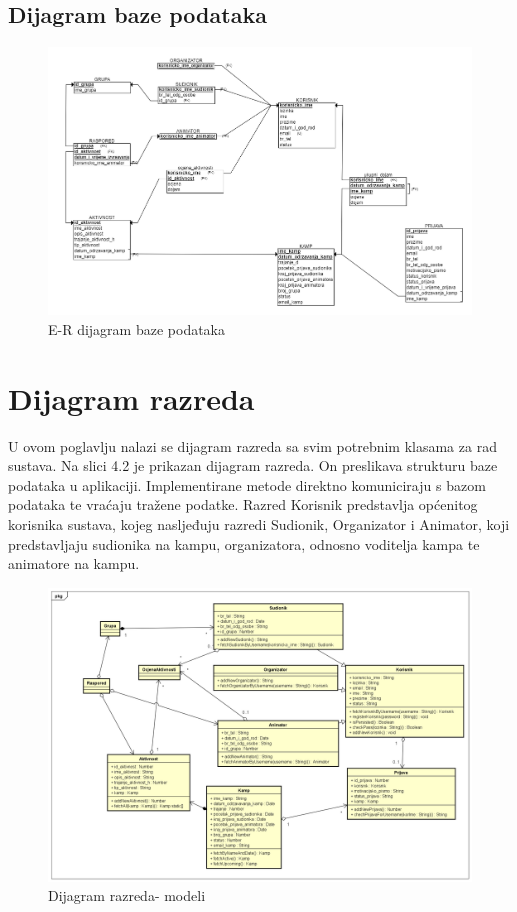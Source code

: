 			\eject
			
			
			\subsection{Dijagram baze podataka}
				\begin{figure}[H]
				\centerline{\includegraphics[width=\linewidth]{slike/ER_model_baze.png}}
				\caption{E-R dijagram baze podataka}
				\label{fig:ERdijagram}
			\end{figure}
			
			\eject
			
			
		\section{Dijagram razreda}
		
		U ovom poglavlju nalazi se dijagram razreda sa svim potrebnim klasama za rad sustava. Na slici 4.2 je prikazan dijagram razreda. On preslikava strukturu baze podataka u aplikaciji. Implementirane metode direktno komuniciraju s bazom podataka te vraćaju tražene podatke. Razred Korisnik predstavlja općenitog korisnika sustava, kojeg nasljeđuju razredi Sudionik, Organizator i Animator, koji predstavljaju sudionika na kampu, organizatora, odnosno voditelja kampa te animatore na kampu.
			\begin{figure}[H]
				\centerline{\includegraphics[width=\linewidth]{slike/Dijagram_razreda_modeli.png}}
				\caption{Dijagram razreda- modeli}
				\label{fig:dijagram_razreda_modeli}
			\end{figure}
			
